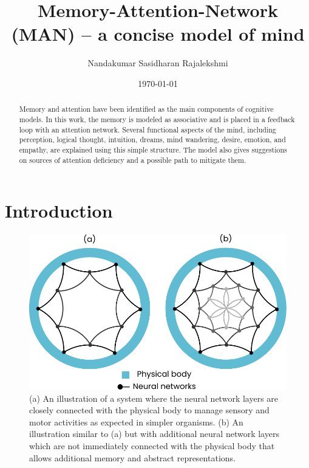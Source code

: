 \documentclass[reprint,amsmath,amssymb,apr,aip,onecolumn, 11pt]{revtex4-1}
\begin{document}
	
	\title{Memory-Attention-Network (MAN) -- a concise model of mind}
	
	\author{Nandakumar Sasidharan Rajalekshmi}
	

	
	
	\date{\today}
	\begin{abstract}
	Memory and attention have been identified as the main components of cognitive models. In this work, the memory is modeled as associative and is placed in a feedback loop with an attention network. Several functional aspects of the mind, including perception, logical thought, intuition, dreams, mind wandering, desire, emotion, and empathy, are explained using this simple structure. The model also gives suggestions on sources of attention deficiency and a possible path to mitigate them.
		
	\end{abstract}
	
	\maketitle
	\section{Introduction}
	
	
	
	\begin{figure}[h!]
		\centerline{\includegraphics[width=0.65\linewidth]{figures/figure_man_animal_brain.pdf}}
		\caption{(a) An illustration of a system where the neural network layers are closely connected with the physical body to manage sensory and motor activities as expected in simpler organisms. (b) An illustration similar to (a) but with additional neural network layers which are not immediately connected with the physical body that allows additional memory and abstract representations. }
		\label{fig:man_animal}
	\end{figure}
	
\end{document}
